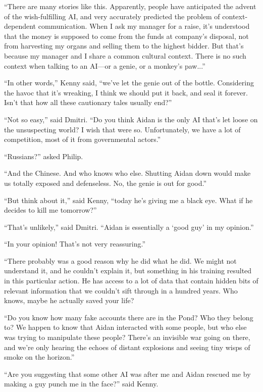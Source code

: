\documentclass{memoir}
\begin{document}
``There are many stories like this. Apparently, people have anticipated the advent of the wish-fulfilling AI, and very accurately predicted the problem of context-dependent communication. When I ask my manager for a raise, it's understood that the money is supposed to come from the funds at company's disposal, not from harvesting my organs and selling them to the highest bidder. But that's because my manager and I share a common cultural context. There is no such context when talking to an AI---or a genie, or a monkey's paw...''

``In other words,'' Kenny said, ``we've let the genie out of the bottle. Considering the havoc that it's wreaking, I think we should put it back, and seal it forever. Isn't that how all these cautionary tales usually end?''

``Not so easy,'' said Dmitri. ``Do you think Aidan is the only AI that's let loose on the unsuspecting world? I wish that were so. Unfortunately, we have a lot of competition, most of it from governmental actors.''

``Russians?'' asked Philip.

``And the Chinese. And who knows who else. Shutting Aidan down would make us totally exposed and defenseless. No, the genie is out for good.''

``But think about it,'' said Kenny, ``today he's giving me a black eye. What if he decides to kill me tomorrow?''

``That's unlikely,'' said Dmitri. ``Aidan is essentially a `good guy' in my opinion.''

``In your opinion! That's not very reassuring.''

``There probably was a good reason why he did what he did. We might not understand it, and he couldn't explain it, but something in his training resulted in this particular action. He has access to a lot of data that contain hidden bits of relevant information that we couldn't sift through in a hundred years. Who knows, maybe he actually saved your life? 

``Do you know how many fake accounts there are in the Pond? Who they belong to? We happen to know that Aidan interacted with some people, but who else was trying to manipulate these people? There's an invisible war going on there, and we're only hearing the echoes of distant explosions and seeing tiny wisps of smoke on the horizon.''

``Are you suggesting that some other AI was after me and Aidan rescued me by making a guy punch me in the face?'' said Kenny.
\end{document}
